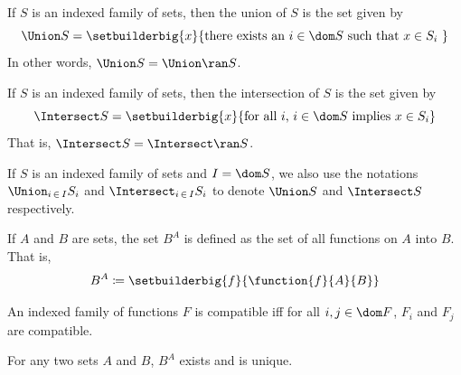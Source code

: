 \begin{dfn}[Union]
     \label{dfn:metatheory-union-of-indexed-family-of-sets}
    If \( S \) is an indexed family of sets, then the union of \( S \) is the set given by
    \begin{equation*}
        \Union S  = \setbuilderbig{x}{\text{there exists an \( i \in \dom S \) such that \( x \in S_{i} \) }}
    \end{equation*}
    In other words, \( \Union S = \Union \ran S \).
\end{dfn}

\begin{dfn}[Intersection]
     \label{dfn:metatheory-intersection-of-indexed-family-of-sets}
    If \( S \) is an indexed family of sets, then the intersection of \( S \) is the set given by
    \begin{equation*}
        \Intersect S = \setbuilderbig{x}{\text{for all \( i \), \( i \in \dom S \) implies \( x \in S_{i} \)}}
    \end{equation*}
    That is, \( \Intersect S = \Intersect \ran S \).
\end{dfn}

\begin{notation}
    If \( S \) is an indexed family of sets and \( I = \dom S \),
    we also use the notations \( \Union_{i \,\in\, I}  S_{i} \) and \( \Intersect_{i \,\in\, I} S_{i} \) to denote \( \Union S \) and \( \Intersect S \) respectively.
\end{notation}

\begin{dfn}[Exponentiation]
     \label{dfn:metatheory-set-exponentiation}
    If \( A \) and \( B \) are sets, the set \( B^{A} \) is defined as the set of all functions on \( A \) into \( B \). That is,
    \begin{equation*}
        B^{A} \coloneq \setbuilderbig{f}{\function{f}{A}{B}}
    \end{equation*}
\end{dfn}

\begin{dfn}[Compatibility]
     \label{dfn:metatheory-compatibility-of-indexed-families-of-functions}
    An indexed family of functions \( F \) is compatible iff for all \( i, j \in \dom F \), \( F_{i} \) and \( F_{j} \) are compatible.
\end{dfn}

\begin{thm}
     \label{thm:metatheory-existence-of-set-exponentiation}
    For any two sets \( A \) and \( B \), \( B^{A} \) exists and is unique.
\end{thm}

